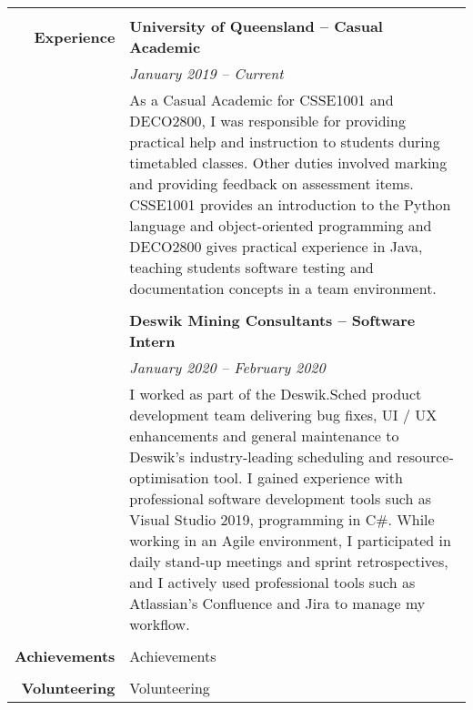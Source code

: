 \documentclass[12pt,twoside,a4paper]{article}
\begin{document}
\begin{tabularx}{\textwidth}{r | L}
										& \\
	\textbf{Experience} 		& \textbf{University of Queensland – Casual Academic} \\
										& \textit{January 2019 – Current} \\
										& As a Casual Academic for CSSE1001 and DECO2800, I was responsible for providing practical help and instruction to students during timetabled classes. Other duties involved marking and providing feedback on assessment items. CSSE1001 provides an introduction to the Python language and object-oriented programming and DECO2800 gives practical experience in Java, teaching students software testing and documentation concepts in a team environment. \\ 
										& \\
										& \textbf{Deswik Mining Consultants – Software Intern} \\
										& \textit{January 2020 – February 2020} \\
										& I worked as part of the Deswik.Sched product development team delivering bug fixes, UI / UX enhancements and general maintenance to Deswik’s industry-leading scheduling and resource-optimisation tool. I gained experience with professional software development tools such as Visual Studio 2019, programming in C\#. While working in an Agile environment, I participated in daily stand-up meetings and sprint retrospectives, and I actively used professional tools such as Atlassian’s Confluence and Jira to manage my workflow. \\ 
										& \\
	\textbf{Achievements} 	& Achievements \\
										& \\
	\textbf{Volunteering} 	& Volunteering
\end{tabularx}
\end{document}
